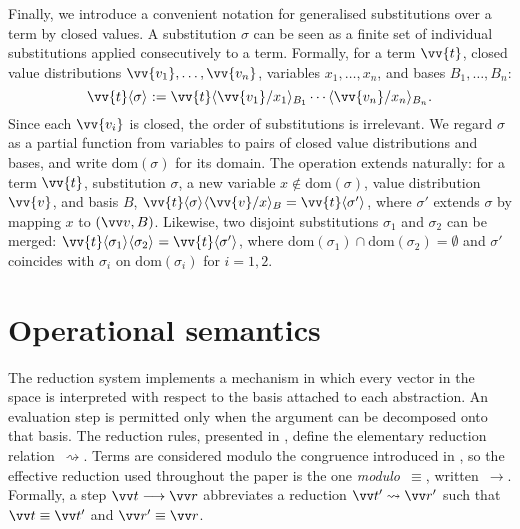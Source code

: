 \documentclass[runningheads,orivec,envcountsame,envcountsect]{llncs}
\newcommand\lra{\longrightarrow}
\newcommand\ansubst[2]{\ensuremath{\langle #1 \rangle_{#2}}}
\newcommand\dom[1]{\mathrm{dom}(#1)}
\def\lraneq{\rightsquigarrow}
\begin{document}
Finally, we introduce a convenient notation for generalised substitutions over
a term by closed values. A substitution $\sigma$ can be seen as a finite set of
individual substitutions applied consecutively to a term. Formally, for a term
$\vv{t}$, closed value distributions $\vv{v_1},\dots,\vv{v_n}$, variables
$x_1,\dots,x_n$, and bases $B_1,\dots,B_n$:
\[
  \vv{t}\ansubst{\sigma}{}
  := \vv{t}\ansubst{\vv{v_1}/x_1}{B_1}\dotsb\ansubst{\vv{v_n}/x_n}{B_n}.
\]
Since each $\vv{v_i}$ is closed, the order of substitutions is irrelevant. We
regard $\sigma$ as a partial function from variables to pairs of closed value
distributions and bases, and write $\dom{\sigma}$ for its domain. The operation
extends naturally: for a term $\vv{t}$, substitution $\sigma$, a new variable
$x\notin\dom{\sigma}$, value distribution $\vv{v}$, and basis $B$,
\(
  \vv{t}\ansubst{\sigma}{}\ansubst{\vv{v}/x}{B}
  = \vv{t}\ansubst{\sigma'}{}
\),
where $\sigma'$ extends $\sigma$ by mapping $x$ to $(\vv v,B)$. Likewise, two
disjoint substitutions $\sigma_1$ and $\sigma_2$ can be merged:
\(
  \vv{t}\ansubst{\sigma_1}{}\ansubst{\sigma_2}{}
  = \vv{t}\ansubst{\sigma'}{}
\),
where $\dom{\sigma_1}\cap\dom{\sigma_2}=\emptyset$ and $\sigma'$ coincides with
$\sigma_i$ on $\dom{\sigma_i}$ for $i=1,2$.


\section{Operational semantics}\label{sec:reduction}

The reduction system implements a mechanism in which every vector in the space
is interpreted with respect to the basis attached to each abstraction. An
evaluation step is permitted only when the argument can be decomposed onto that
basis. The reduction rules, presented in
, define the elementary
reduction relation~$\lraneq$. Terms are considered modulo the congruence
introduced in , so the
effective reduction used throughout the paper is the one
\emph{modulo~$\equiv$}, written~$\lra$.  Formally, a step $\vv t\lra\vv r$
abbreviates a reduction $\vv t'\lraneq\vv r'$ such that $\vv t\equiv\vv t'$
and $\vv r'\equiv\vv r$.
\end{document}
